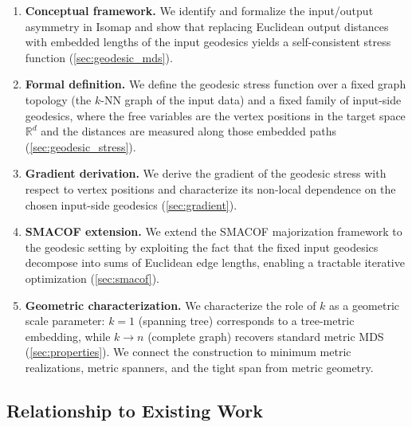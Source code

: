 \documentclass[twoside,11pt]{article}
\newcommand{\R}{\mathbb{R}}
\begin{document}
\begin{enumerate}
  \item \textbf{Conceptual framework.}  We identify and formalize the
  input/output asymmetry in Isomap and show that replacing Euclidean
  output distances with embedded lengths of the input geodesics yields a
  self-consistent stress function (\cref{sec:geodesic_mds}).

  \item \textbf{Formal definition.}  We define the geodesic stress function
  over a fixed graph topology (the $k$-NN graph of the input data) and a
  fixed family of input-side geodesics, where the free variables are the
  vertex positions in the target space $\R^d$ and the distances are
  measured along those embedded paths
  (\cref{sec:geodesic_stress}).

  \item \textbf{Gradient derivation.}  We derive the gradient of the
  geodesic stress with respect to vertex positions and characterize its
  non-local dependence on the chosen input-side geodesics
  (\cref{sec:gradient}).

  \item \textbf{SMACOF extension.}  We extend the SMACOF majorization
  framework \citep{deleeuw1977applications, deleeuw2009multidimensional}
  to the geodesic setting by exploiting the fact that the fixed input
  geodesics decompose into sums of Euclidean edge lengths, enabling a
  tractable iterative optimization (\cref{sec:smacof}).

  \item \textbf{Geometric characterization.}  We characterize the role of
  $k$ as a geometric scale parameter: $k=1$ (spanning tree) corresponds to
  a tree-metric embedding, while $k \to n$ (complete graph) recovers
  standard metric MDS (\cref{sec:properties}).  We connect the construction
  to minimum metric realizations, metric spanners, and the tight span from
  metric geometry.
\end{enumerate}

\subsection{Relationship to Existing Work}
\end{document}
